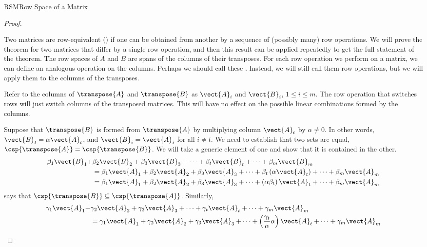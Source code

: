 \begin{subsect}{RSM}{Row Space of a Matrix}
\begin{proof}
\begin{para}Two matrices are row-equivalent () if one can be obtained from another by a sequence of (possibly many) row operations.  We will prove the theorem for two matrices that differ by a single row operation, and then this result can be applied repeatedly to get the full statement of the theorem.  The row spaces of $A$ and $B$ are spans of the columns of their transposes.  For each row operation we perform on a matrix, we can define an analogous operation on the columns.  Perhaps we should call these .  Instead, we will still call them row operations, but we will apply them to the columns of the transposes.\end{para}
%
\begin{para}Refer to the columns of $\transpose{A}$ and $\transpose{B}$ as $\vect{A}_i$ and $\vect{B}_i$, $1\leq i\leq m$.  The row operation that switches rows will just switch columns of the transposed matrices.  This will have no effect on the possible linear combinations formed by the columns.\end{para}
%
\begin{para}Suppose that $\transpose{B}$ is formed from $\transpose{A}$ by multiplying column $\vect{A}_t$ by $\alpha\neq 0$.  In other words, $\vect{B}_t=\alpha\vect{A}_t$, and $\vect{B}_i=\vect{A}_i$ for all $i\neq t$.  We need to establish that two sets are equal, $\csp{\transpose{A}}=\csp{\transpose{B}}$.  We will take a generic element of one and show that it is contained in the other.
%
\begin{align*}
\beta_1\vect{B}_1+
&
\beta_2\vect{B}_2+
\beta_3\vect{B}_3+
\cdots+
\beta_t\vect{B}_t+
\cdots+
\beta_m\vect{B}_m\\
%
&=
\beta_1\vect{A}_1+
\beta_2\vect{A}_2+
\beta_3\vect{A}_3+
\cdots+
\beta_t\left(\alpha\vect{A}_t\right)+
\cdots+
\beta_m\vect{A}_m\\
%
&=
\beta_1\vect{A}_1+
\beta_2\vect{A}_2+
\beta_3\vect{A}_3+
\cdots+
\left(\alpha\beta_t\right)\vect{A}_t+
\cdots+
\beta_m\vect{A}_m
\end{align*}
%
says that $\csp{\transpose{B}}\subseteq\csp{\transpose{A}}$.  Similarly,
%
\begin{align*}
\gamma_1\vect{A}_1+
&
\gamma_2\vect{A}_2+
\gamma_3\vect{A}_3+
\cdots+
\gamma_t\vect{A}_t+
\cdots+
\gamma_m\vect{A}_m\\
%
&=
\gamma_1\vect{A}_1+
\gamma_2\vect{A}_2+
\gamma_3\vect{A}_3+
\cdots+
\left(\frac{\gamma_t}{\alpha}\alpha\right)\vect{A}_t+
\cdots+
\gamma_m\vect{A}_m\\

\end{align*}
\end{para}
\end{proof}
\end{subsect}
